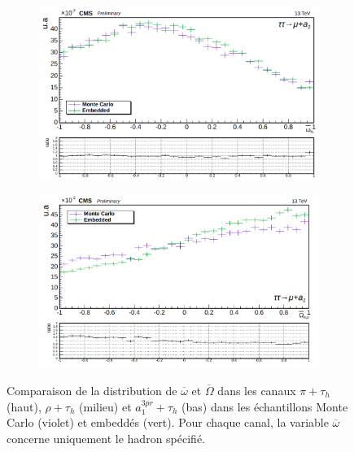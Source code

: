 \begin{figure}
    \begin{subfigure}[b]{0.5\linewidth}
    \centering
    \includegraphics[width=\linewidth]{Chapitre6/Images/OptVar/omegabar_a1_a1mu.png} 
    \caption*{} 
    \vspace{0.5ex}
  \end{subfigure}%
  \begin{subfigure}[b]{0.5\linewidth}
    \centering
    \includegraphics[width=\linewidth]{Chapitre6/Images/OptVar/Omegabar_a1mu.png} 
    \caption*{} 
    \vspace{0.5ex}
  \end{subfigure}
  \caption{Comparaison de la distribution de $\overline{\omega}$ et $\overline{\Omega}$ dans les canaux $\pi+\tau_h$ (haut), $\rho+\tau_h$ (milieu) et $a_1^{3pr}+\tau_h$ (bas) dans les échantillons Monte Carlo (violet) et embeddés (vert). Pour chaque canal, la variable $\overline{\omega}$ concerne uniquement le hadron spécifié.}
  \label{omegabar_mutau}
\end{figure}

